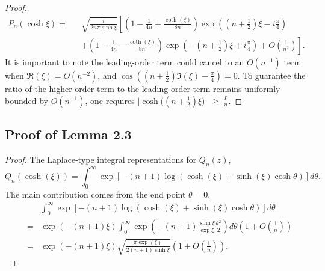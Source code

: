 \documentclass[11pt]{article}
\begin{document}
\begin{proof}
\begin{eqnarray}
    P_n(\cosh \xi) =&& \sqrt{\frac{i}{2n\pi \sinh \xi}}\left[\left(1 - \frac{1}{4n} + \frac{\coth(\xi)}{8n}\right)\exp\left((n+\frac{1}{2})\xi-i\frac{\pi}{4}\right) \right. \nonumber\\
    && \left.  + \left(1 - \frac{1}{4n} - \frac{\coth(\xi)}{8n}\right)\exp\left(-(n+\frac{1}{2})\xi+i\frac{\pi}{4}\right) + O(\frac{1}{n^2}) \right].
\end{eqnarray}
It is important to note the leading-order term could cancel to an $O(n^{-1})$ term when $\Re(\xi) = O(n^{-2})$, and $\cos\left((n+\frac{1}{2})\Im(\xi)-\frac{\pi}{4}\right)=0$. To guarantee the ratio of the higher-order term to the leading-order term remains uniformly bounded by $O(n^{-1})$, one requires $\bigl|\cosh\!\bigl((n+\tfrac{1}{2})\xi\bigr)\bigr| \;\geq\; \frac{L}{n}$.
\end{proof}

\subsection{Proof of Lemma 2.3}
\begin{proof}
The Laplace-type integral representations for $Q_n(z)$,
\begin{equation}
    Q_n(\cosh(\xi)) =  \int_0^\infty \exp \left[-(n+1) \log\left(\cosh(\xi) + \sinh(\xi) \cosh \theta \right)\right] d\theta. \label{Q_laplace_integral}
\end{equation}
The main contribution comes from the end point $\theta =0$. 
\begin{eqnarray}
    && \int_0^\infty \exp \left[-(n+1) \log\left(\cosh(\xi) + \sinh(\xi) \cosh \theta \right)\right] d\theta \nonumber\\
    &=& \exp \left(-(n+1)\xi  \right)\int_0^{\infty} \exp \left( - (n+1)\frac{\sinh \xi}{\exp \xi} \frac{\theta^2}{2} \right) d\theta \left( 1 + O(\frac{1}{n}) \right) \nonumber\\
    &=& \exp \left(-(n+1)\xi  \right) \sqrt{\frac{\pi \exp(\xi)}{2(n+1) \sinh \xi}}  \left( 1 + O(\frac{1}{n}) \right).\label{Q_steepest_0}
\end{eqnarray}
\end{proof}
\end{document}
